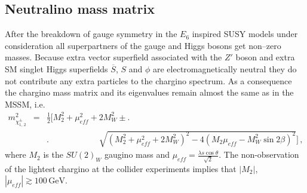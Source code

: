 \documentclass[12pt,a4paper]{article}
\newcommand{\be}{\begin{equation}}
\newcommand{\ee}{\end{equation}}
\newcommand{\ba}{\begin{array}}
\newcommand{\ea}{\end{array}}
\newcommand{\ds}{\displaystyle}
\begin{document}
\begin{appendix}
\section{Neutralino mass matrix}
\setcounter{equation}{0}
\def\theequation{A.\arabic{equation}}

After the breakdown of gauge symmetry in the $E_6$ inspired SUSY models under consideration
all superpartners of the gauge and Higgs bosons get non--zero masses. Because extra vector
superfield associated with the $Z'$ boson and extra SM singlet Higgs superfields
$\overline{S}$, $S$ and $\phi$ are electromagnetically neutral they do not contribute any
extra particles to the chargino spectrum. As a consequence the chargino mass matrix and
its eigenvalues remain almost the same as in the MSSM, i.e.
\be
\ba{rcl}
m^2_{\chi^{\pm}_{1,\,2}}&=&\ds\frac{1}{2}\biggl[M_2^2+\mu_{eff}^2+2 M^2_{W}\pm\biggl.\\[2mm]
&&\biggr.\qquad\qquad\qquad\sqrt{(M_2^2+\mu^2_{eff}+2M^2_{W})^2-4(M_2\mu_{eff}-M^2_{W}\sin 2\beta)^2}
\biggr]\,,
\ea
\label{a1}
\ee
where $M_2$ is the $SU(2)_W$ gaugino mass and $\mu_{eff}=\ds\frac{\lambda s \cos\theta}{\sqrt{2}}$.
The non-observation of the lightest chargino at the collider experiments implies that
$|M_2|$, $|\mu_{eff}|\gtrsim 100\,\mbox{GeV}$.


\end{appendix}
\end{document}
